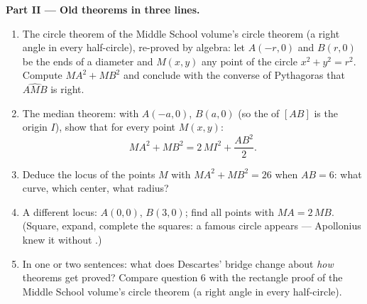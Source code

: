 \begin{problem}
\medskip
\noindent\textbf{Part II --- Old theorems in three lines.}
\begin{enumerate}[resume]
  \item The circle theorem of the Middle School volume's circle theorem (a right angle in every half-circle),
        re-proved by algebra: let $A(-r, 0)$ and $B(r, 0)$ be
        the ends of a diameter and $M(x, y)$ any point of the
        circle $x^2 + y^2 = r^2$. Compute $MA^2 + MB^2$ and
        conclude with the converse of Pythagoras that
        $\widehat{AMB}$ is right.
  \item The median theorem: with $A(-a, 0)$, $B(a, 0)$ (so the
         of $[AB]$ is the origin $I$), show that for
        every point $M(x, y)$:
        \[
        MA^2 + MB^2 = 2\,MI^2 + \frac{AB^2}{2} .
        \]
  \item Deduce the locus of the points $M$ with
        $MA^2 + MB^2 = 26$ when $AB = 6$: what curve, which
        center, what radius?
  \item A different locus: $A(0,0)$, $B(3,0)$; find all points
        with $MA = 2\,MB$. (Square, expand, complete the
        squares: a famous circle appears --- Apollonius knew it
        without .)
  \item In one or two sentences: what does Descartes' bridge
        change about \emph{how} theorems get proved? Compare
        question 6 with the rectangle proof of
        the Middle School volume's circle theorem (a right angle in every half-circle).
\end{enumerate}


\end{problem}
